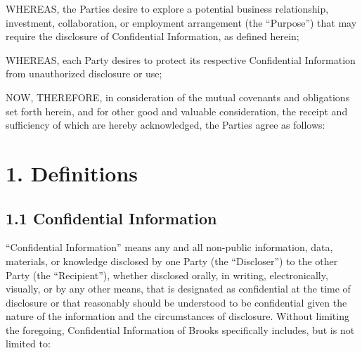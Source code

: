\documentclass{article}
\begin{document}
WHEREAS, the Parties desire to explore a potential business relationship, investment, collaboration, or employment arrangement (the ``Purpose'') that may require the disclosure of Confidential Information, as defined herein;

WHEREAS, each Party desires to protect its respective Confidential Information from unauthorized disclosure or use;

NOW, THEREFORE, in consideration of the mutual covenants and obligations set forth herein, and for other good and valuable consideration, the receipt and sufficiency of which are hereby acknowledged, the Parties agree as follows:

\section{1. Definitions}

\subsection{1.1 Confidential Information}

``Confidential Information'' means any and all non-public information, data, materials, or knowledge disclosed by one Party (the ``Discloser'') to the other Party (the ``Recipient''), whether disclosed orally, in writing, electronically, visually, or by any other means, that is designated as confidential at the time of disclosure or that reasonably should be understood to be confidential given the nature of the information and the circumstances of disclosure. Without limiting the foregoing, Confidential Information of Brooks specifically includes, but is not limited to:
\end{document}
